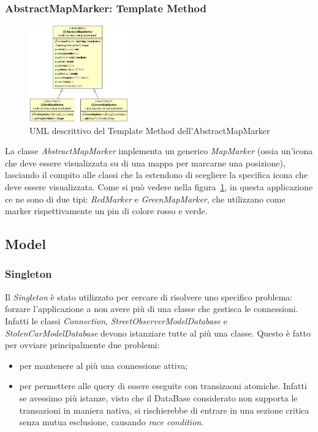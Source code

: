 \documentclass[a4paper,12pt]{report}
\begin{document}
    \subsubsection {AbstractMapMarker: Template Method}
    \begin{figure}
      \vspace{-60pt}
      \begin{center}
	  \includegraphics[width=0.38\textwidth]{images/UMLmapMarker}
	\caption{UML descrittivo del Template Method dell'AbstractMapMarker}
	\label{fig:UMLmapMarker}
      \end{center}
      \vspace{-60pt}
    \end{figure}

    La classe \textit{AbstractMapMarker} implementa un generico 
\textit{MapMarker} (ossia un'icona che deve essere visualizzata su di una mappa 
per marcarne una posizione), lasciando il compito alle classi che la estendono 
di scegliere la specifica icona che deve essere visualizzata. Come si può 
vedere nella figura~\ref{fig:UMLmapMarker}, in questa applicazione ce 
ne sono di due tipi: \textit{RedMarker} e \textit{GreenMapMarker}, che 
utilizzano come marker rispettivamente un pin di colore rosso e verde.


  \subsection{Model}
  
    \subsubsection {Singleton}
    Il \textit{Singleton} è stato utilizzato per cercare di risolvere uno 
specifico problema: forzare l'applicazione a non avere più di una classe che 
gestisca le connessioni. Infatti le classi \textit{Connection}, 
\textit{StreetObserverModelDatabase} e \textit{StolenCarModelDatabase} 
devono istanziare tutte al più una classe. Questo è fatto per ovviare 
principalmente due problemi: 
    \begin{itemize}
      \item per mantenere al più una connessione attiva;
      \item per permettere alle query di essere eseguite con transizaoni 
atomiche. Infatti se avessimo più istanze, visto che il DataBase considerato 
non supporta le transazioni in maniera nativa, si rischierebbe di entrare in 
una sezione critica senza mutua esclusione, causando \textit{race condition}.
    \end{itemize}
\end{document}
